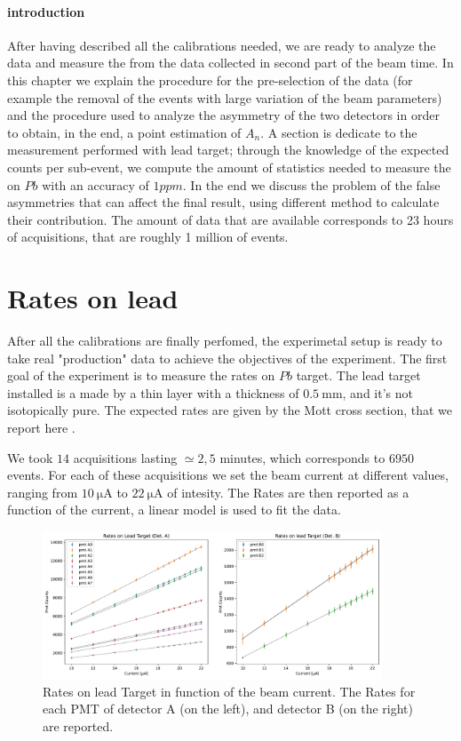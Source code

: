 \paragraph{introduction}
After having described all the calibrations needed, we are ready to analyze the data and measure the \transv from the data collected in second part of the beam time. In this chapter we explain the procedure for the pre-selection of the data (for example the removal of the events with large variation of the beam parameters) and the procedure used to analyze the asymmetry of the two detectors in order to obtain, in the end, a point estimation of $A_{n}$. A section is dedicate to the measurement performed with lead target; through the knowledge of the expected counts per sub-event, we compute the amount of statistics needed to measure the \transv on $Pb$ with an accuracy of $1 ppm$. In the end we discuss the problem of the false asymmetries that can affect the final result, using different method to calculate their contribution.
The amount of data that are available corresponds to 23 hours of acquisitions, that are roughly 1 million of events. 

\section{Rates on lead}

After all the calibrations are finally perfomed, the experimetal setup is ready to take real "production" data 
to achieve the objectives of the experiment. The first goal of the experiment is to measure the rates on $Pb$ target.
The lead target installed is a made by a thin layer with a thickness of $\SI{0.5}{\milli \meter}$, and it's not isotopically pure. The expected rates are given by the Mott cross section, that we report here .\medskip

We took $14$ acquisitions lasting $\simeq 2,5$ minutes, which corresponds to $6950$ events. For each of these acquisitions we set the beam current at different values, ranging from $\SI{10}{\micro \ampere}$ to $\SI{22}{\micro \ampere}$ of intesity. The Rates are then reported as a function of the current, a linear model is used to fit the data.

\begin{figure}[hbtp]
\centering
\includegraphics[width = 0.9\textwidth]{Analysis/LeadRates/LeadRates.pdf}
\caption{Rates on lead Target in function of the beam current. The Rates for each PMT of detector A (on the left), and detector B (on the right) are reported.}
\end{figure}

